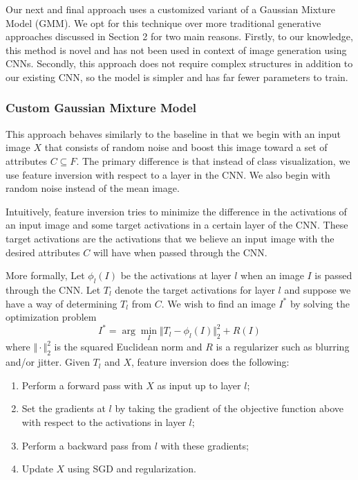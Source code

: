 \documentclass[10pt,twocolumn,letterpaper]{article}
\begin{document}
Our next and final approach uses a customized variant of a Gaussian Mixture Model (GMM). We opt for this technique over more traditional generative approaches discussed in Section 2 for two main reasons. 
Firstly, to our knowledge, this method is novel and has not been used in context of image generation using CNNs.
Secondly, this approach does not require complex structures in addition to our existing CNN, so the model is simpler and has far fewer parameters to train.

\subsubsection{Custom Gaussian Mixture Model}
This approach behaves similarly to the baseline in that we begin with an input image $X$ that consists of random noise and boost this image toward a set of attributes $C\subseteq F$.
The primary difference is that instead of class visualization, we use feature inversion with respect to a layer in the CNN. We also begin with random noise instead of the mean image.


Intuitively, feature inversion tries to minimize the difference in the activations of an input image and some target activations in a certain layer of the CNN.
These target activations are the activations that we believe an input image with the desired attributes $C$ will have when passed through the CNN.

More formally, Let $\phi_l(I)$ be the activations at layer $l$ when an image $I$ is passed through the CNN. 
Let $T_l$ denote the target activations for layer $l$ and suppose we have a way of determining $T_l$ from $C$.
We wish to find an image $I^*$ by solving the optimization problem
\begin{equation}
    I^* = \arg\min_{I} \Vert T_l - \phi_l(I) \Vert_2^2 + R(I)
\end{equation}
where $\Vert \cdot \Vert_2^2$ is the squared Euclidean norm and $R$ is a regularizer such as blurring and/or jitter.
Given $T_l$ and $X$, feature inversion does the following:
    \begin{enumerate}
        \item Perform a forward pass with $X$ as input up to layer $l$;
        \item Set the gradients at $l$ by taking the gradient of the objective function above with respect to the activations in layer $l$;
        \item Perform a backward pass from $l$ with these gradients;
        \item Update $X$ using SGD and regularization.
    \end{enumerate}
\end{document}
